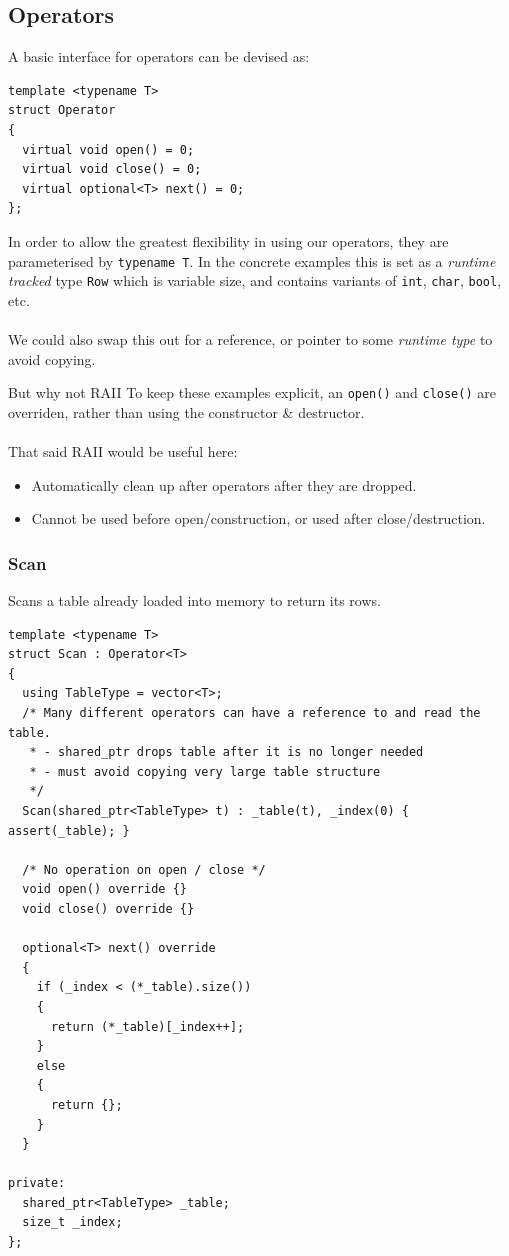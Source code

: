 \subsection{Operators}
A basic interface for operators can be devised as:
\begin{verbatim}
template <typename T>
struct Operator
{
  virtual void open() = 0;
  virtual void close() = 0;
  virtual optional<T> next() = 0;
};
\end{verbatim}
In order to allow the greatest flexibility in using our operators, they are parameterised by \texttt{typename T}.
In the concrete examples this is set as a \textit{runtime tracked} type \texttt{Row} which is variable size, and contains variants of \texttt{int}, \texttt{char}, \texttt{bool}, etc.
\\
\\ We could also swap this out for a reference, or pointer to some \textit{runtime type} to avoid copying.

\begin{sidenotebox}{But why not RAII}
  To keep these examples explicit, an \texttt{open()} and \texttt{close()} are overriden, rather than using the constructor \& destructor.
  \\
  \\ That said RAII would be useful here:
  \begin{itemize}
    \item Automatically clean up after operators after they are dropped.
    \item Cannot be used before open/construction, or used after close/destruction.
  \end{itemize}
\end{sidenotebox}

\subsubsection{Scan}
Scans a table already loaded into memory to return its rows.
\begin{verbatim}
template <typename T>
struct Scan : Operator<T>
{
  using TableType = vector<T>;
  /* Many different operators can have a reference to and read the table.
   * - shared_ptr drops table after it is no longer needed
   * - must avoid copying very large table structure
   */
  Scan(shared_ptr<TableType> t) : _table(t), _index(0) { assert(_table); }

  /* No operation on open / close */
  void open() override {}
  void close() override {}

  optional<T> next() override
  {
    if (_index < (*_table).size())
    {
      return (*_table)[_index++];
    }
    else
    {
      return {};
    }
  }

private:
  shared_ptr<TableType> _table;
  size_t _index;
};
\end{verbatim}

